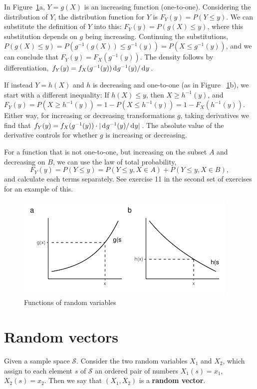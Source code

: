 \documentclass[10pt]{article}
\begin{document}
In Figure~\ref{fig:frv}a, $Y=g(X)$ is an increasing function (one-to-one). 
Considering the distribution of $Y$, 
the distribution function for $Y$ is $F_Y(y) = P(Y\leq y)$. We can substitute
the definition of $Y$ into this: $F_Y(y) = P(g(X)\leq y)$, where this
substitution depends on $g$ being increasing. Continuing
the substitutions, $P(g(X) \leq y) = P( g^{-1}(g(X)) \leq g^{-1}(y)) = P(X\leq g^{-1}(y))$,
and we can conclude that $F_Y(y)= F_X(g^{-1}(y))$. The density follows by differentiation, 
$f_Y(y) = f_X(g^{-1}(y)) \rd g^{-1}(y)/\rd y$.

If instead $Y=h(X)$ and $h$ is decreasing and one-to-one (as in Figure ~\ref{fig:frv}b), we
start with a different inequality: If $h(X) \leq y$, then $X\geq h^{-1}(y)$,
and $F_Y(y) = P(X\geq h^{-1}(y)) = 1 - P(X\leq h^{-1}(y)) = 1 - F_X(h^{-1}(y))$.
Either way, for increasing or decreasing transformations $g$, taking derivatives we find that 
$f_Y(y) = f_X(g^{-1}(y)) \cdot | \rd g^{-1}(y)/\rd y|$.
The absolute value of the derivative controls for whether $g$ is increasing or decreasing.

For a function that is not one-to-one, but increasing on the subset 
$A$ and decreasing on $B$, we can use the
law of total probability, \[F_Y(y) = P(Y\leq y)= P(Y\leq y , X\in A) + P(Y\leq y , X\in B),\] and 
calculate each terms separately. See exercise 11 in the second
set of exercises for an example of this.

\begin{figure}[tb]
\includegraphics[width=0.95\textwidth]{../graphs/transformation_of_RV}

\caption{Functions of random variables}\label{fig:frv}
\end{figure}



\section{Random vectors}
Given a sample space $\mathcal{S}$. Consider the
two random variables $X_1$ and $X_2$, which assign to each element
$s$ of $\mathcal{S}$ an ordered pair of numbers
$X_1(s)=x_1$, $X_2(s)=x_2$. Then we say that $(X_1,X_2)$ is a
\textbf{random vector}. 
\end{document}
